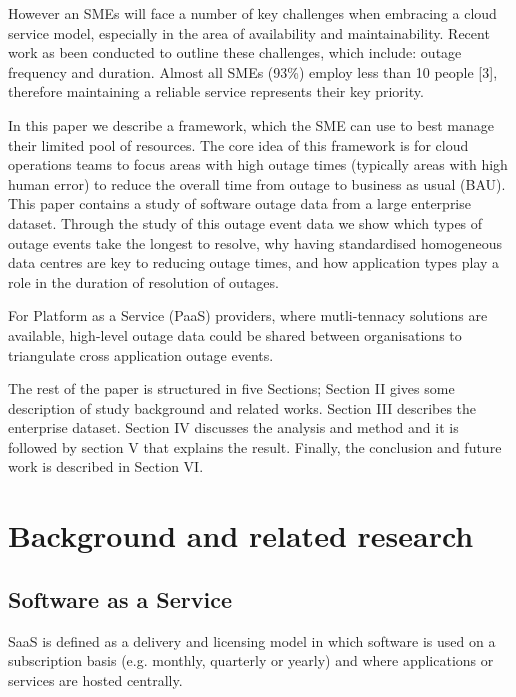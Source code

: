 \documentclass[conference]{IEEEtran}
\begin{document}
However an SMEs will face a number of key challenges when embracing a cloud service model, especially in the area of availability and maintainability. Recent work as been conducted to outline these challenges, which include: outage frequency and duration. Almost all SMEs (93\%) employ less than 10 people [3], therefore maintaining a reliable service represents their key priority. \par

In this paper we describe a framework, which the SME can use to best manage their limited pool of resources. The core idea of this framework is for cloud operations teams to focus areas with high outage times (typically areas with high human error) to reduce the overall time from outage to business as usual (BAU). This paper contains a study of software outage data from a large enterprise dataset. Through the study of this outage event data we show which types of outage events take the longest to resolve, why having standardised homogeneous data centres are key to reducing outage times, and how application types play a role in the duration of resolution of outages. \par

For Platform as a Service (PaaS) providers, where mutli-tennacy solutions are available, high-level outage data could be shared between organisations to triangulate cross application outage events. \par

The rest of the paper is structured in five Sections; Section II gives some description of study background and related works. Section III describes the enterprise dataset. Section IV discusses the analysis and method and it is followed by section V that explains the result. Finally, the conclusion and future work is described in Section VI. \par


\section{Background and related research}

\subsection{Software as a Service}
SaaS is defined as a delivery and licensing model in which software is used on a subscription basis (e.g. monthly, quarterly or yearly) and where applications or services are hosted centrally. \par
\end{document}
